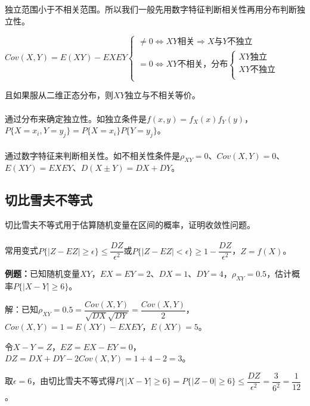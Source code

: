 独立范围小于不相关范围。所以我们一般先用数字特征判断相关性再用分布判断独立性。

$Cov(X,Y)=E(XY)-EXEY\left\{\begin{array}{l}
    \neq0\Leftrightarrow XY\text{相关}\Rightarrow X\text{与}Y\text{不独立} \\
    =0\Leftrightarrow XY\text{不相关，分布}\left\{\begin{array}{l}
        XY\text{独立} \\
        XY\text{不独立} \\
    \end{array}\right.
\end{array}\right.$

且如果服从二维正态分布，则$XY$独立与不相关等价。

\paragraph{}

通过分布来确定独立性。如独立条件是$f(x,y)=f_X(x)f_Y(y)$，$P\{X=x_i,Y=y_j\}=P\{X=x_i\}P\{Y=y_j\}$。

\paragraph{}

通过数字特征来判断相关性。如不相关性条件是$\rho_{XY}=0$、$Cov(X,Y)=0$、$E(XY)=EXEY$、$D(X\pm Y)=DX+DY$。

\subsection{切比雪夫不等式}

切比雪夫不等式用于估算随机变量在区间的概率，证明收敛性问题。

\paragraph{}

常用变式$P\{\vert Z-EZ\vert\geqslant\epsilon\}\leqslant\dfrac{DZ}{\epsilon^2}$或$P\{\vert Z-EZ\vert<\epsilon\}\geqslant1-\dfrac{DZ}{\epsilon^2}$，$Z=f(X)$。

\textbf{例题：}已知随机变量$XY$，$EX=EY=2$、$DX=1$、$DY=4$，$\rho_{XY}=0.5$，估计概率$P\{\vert X-Y\vert\geqslant6\}$。

解：已知$\rho_{XY}=0.5=\dfrac{Cov(X,Y)}{\sqrt{DX}\sqrt{DY}}=\dfrac{Cov(X,Y)}{2}$，$Cov(X,Y)=1=E(XY)-EXEY$，$E(XY)=5$。

令$X-Y=Z$，$EZ=EX-EY=0$，$DZ=DX+DY-2Cov(X,Y)=1+4-2=3$。

取$\epsilon=6$，由切比雪夫不等式得$P\{\vert X-Y\vert\geqslant6\}=P\{\vert Z-0\vert\geqslant6\}\leqslant\dfrac{DZ}{\epsilon^2}=\dfrac{3}{6^2}=\dfrac{1}{12}$。
